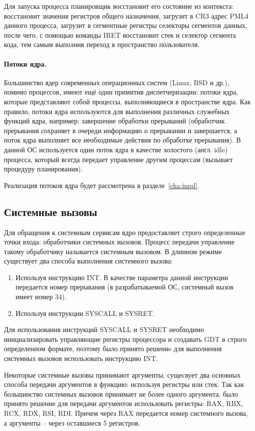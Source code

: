 Для запуска процесса планировщик восстановит его состояние из контекста: восстановит
значения регистров общего назначения, загрузит в CR3 адрес PML4 данного процесса, загрузит
в сегментные регистры селекторы сегментов данных, после чего, с помощью команды IRET восстановит
стек и селектор сегмента кода, тем самым выполнив переход в пространство пользователя.

\paragraph{Потоки ядра.} Большинство ядер современных операционных систем (Linux, BSD и др.),
помимо процессов, имеют ещё один примитив диспетчеризации: потоки ядра, которые представляют
собой процессы, выполняющиеся в пространстве ядра. Как правило, потоки ядра используются для
выполнения различных служебных функций ядра, например: завершение обработки прерываний (обработчик
прерывания сохраняет в очереди информацию о прерывании и завершается, а поток ядра выполняет все
необходимые действия по обработке прерывания). В данной ОС используется один поток ядра в качестве
холостого (англ. idle) процесса, который всегда передает управление другим процессам (вызывает
процедуру планирования).

Реализация потоков ядра будет рассмотрена в разделе~\ref{cha:impl}.

\subsection{Системные вызовы}
Для обращения к системным сервисам ядро предоставляет строго определенные точки входа: обработчики
системных вызовов. Процесс передачи управление такому обработчику называется системным вызовом.
В длинном режиме существует два способа выполнения системного вызова:
\begin{enumerate}[1.]
\item Используя инструкцию INT. В качестве параметра данной инструкции передается номер прерывания
	(в разрабатываемой ОС, системный вызов имеет номер 34).
\item Используя инструкции SYSCALL и SYSRET.
\end{enumerate}

Для использования инструкций SYSCALL и SYSRET необходимо инициализировать управляющие регистры
процессора и создавать GDT в строго определенном формате, поэтому было принято решениe для
выполнения системных вызовов использовать инструкцию INT.

Некоторые системные вызовы принимают аргументы, сущесвует два основных способа передачи
аргументов в функцию: используя регистры или стек. Так как большинство системных вызовов
принимает не более одного аргумента, было принято решение для передачи аргументов использовать
регистры: RAX, RBX, RCX, RDX, RSI, RDI. Причем через RAX передается номер системного вызова,
а аргументы -- через оставшиеся 5 регистров.

